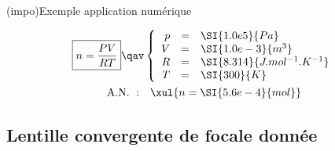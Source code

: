 \documentclass[a4paper, 10pt, garamond, oneside]{book}
\begin{document}
{\begin{tcb}(impo){Exemple application numérique}
	\vspace*{-10pt}
	\begin{minipage}{0.45\linewidth}
		\begin{gather*}
			\boxed{n = \frac{PV}{RT}}
			\qav
			\left\{
			\begin{array}{rcl}
				p & = & \SI{1.0e5}{Pa}                \\
				V & = & \SI{1.0e-3}{m^3}              \\
				R & = & \SI{8.314}{J.mol^{-1}.K^{-1}} \\
				T & = & \SI{300}{K}
			\end{array}
			\right.\\
			\mathrm{A.N.~:}\quad
			\xul{n = \SI{5.6e-4}{mol}}
		\end{gather*}
	\end{minipage}
	\hfill
\end{tcb}
\newpage
}


\subsection{Lentille convergente de focale donnée}
\end{document}
